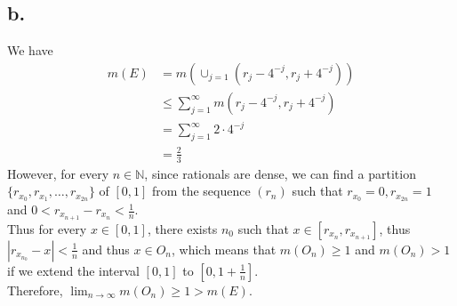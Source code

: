 \documentclass[11pt]{article}
\theoremstyle{mystyle}
\theoremstyle{definition}
\begin{document}
\subsection*{b.}
We have 
\begin{align*}  
  m(E) &= m(\cup_{j=1} (r_j - 4^{-j}, r_j + 4^{-j})) \\
  &\le \sum_{j=1}^\infty m(r_j - 4^{-j}, r_j + 4^{-j}) \\
  &= \sum_{j=1}^\infty 2 \cdot 4^{-j} \\
  &= \displaystyle\frac{2}{3}
\end{align*}
However, for every $n \in \mathbb{N}$, since rationals are dense, we can find a partition $\{r_{x_0}, r_{x_1}, \hdots, r_{x_{2n}}\}$ of $[0,1]$ from the sequence $(r_n)$ such that $r_{x_0} = 0, r_{x_{2n}} = 1$ and $0< r_{x_{n+1}} - r_{x_n} < \displaystyle\frac{1}{n}$. \\
Thus for every $x \in [0,1]$, there exists $n_0$ such that $x \in [r_{x_n}, r_{x_{n+1}}]$, thus  $|r_{x_{n_0}} - x|<\displaystyle\frac{1}{n}$ and thus $x \in O_n$, which means that $m(O_n) \ge 1$ and $m(O_n) > 1$ if we extend the interval $[0,1]$ to $[0,1 + \displaystyle\frac{1}{n}]$. \\
Therefore, $\lim_{n \to \infty} m(O_n) \ge 1 > m(E)$.  
\newpage
\end{document}
